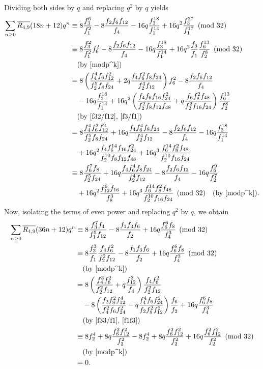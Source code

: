 \documentclass{amsart}
\theoremstyle{definition}
\begin{document}
Dividing both sides by $q$ and replacing $q^2$ by $q$ yields
\begin{align*}
		\sum_{n \ge 0} \overline{R_{4,9}}(18n+12) q^n 
		&\equiv 8 \frac{f_3^6}{f_1^2} - 8 \frac{f_2 f_{6} f_{12}}{f_4} - 16q \frac{f_3^{18}}{f_1^{14}} + 16q^2 \frac{f_3^{27}}{f_1^{17}} \pmod{32} \\
		&\equiv 8 \frac{f_3^2}{f_1^2} f_6^2 - 8 \frac{f_2 f_{6} f_{12}}{f_4} - 16q \frac{f_3^{18}}{f_1^{14}} + 16q^2 \frac{f_3}{f_1} \frac{f_6^{13}}{f_2^{8}} \pmod{32} \\
		&\quad \text{(by \eqref{modp^k})} \\
		&= 8 \left( \frac{f_4^4 f_6 f_{12}^2}{f_2^5 f_8 f_{24}} + 2q \frac{f_4 f_6^2 f_8 f_{24}}{f_2^4 f_{12}} \right) f_6^2 - 8 \frac{f_2 f_{6} f_{12}}{f_4} \\
		&\quad - 16q \frac{f_3^{18}}{f_1^{14}} + 16q^2 \left( \frac{f_4 f_6 f_{16} f_{24}^2}{f_2^2 f_8 f_{12} f_{48}} + q \frac{f_6 f_8^2 f_{48}}{f_2^2 f_{16} f_{24}} \right) \frac{f_6^{13}}{f_2^{8}} \\
		&\quad \text{(by \eqref{f32/f12}, \eqref{f3/f1})} \\
		&= 8 \frac{f_4^4 f_6^3 f_{12}^2}{f_2^5 f_8 f_{24}} + 16q \frac{f_4 f_6^4 f_8 f_{24}}{f_2^4 f_{12}} - 8 \frac{f_2 f_6 f_{12}}{f_4} - 16q \frac{f_3^{18}}{f_1^{14}} \\
		&\quad + 16q^2 \frac{f_4 f_6^{14} f_{16} f_{24}^2}{f_2^{10} f_8 f_{12} f_{48}} + 16q^3 \frac{f_6^{14} f_8^2 f_{48}}{f_2^{10} f_{16} f_{24}} \\
		&\equiv 8 \frac{f_6^7 f_8}{f_2^5 f_{24}} + 16q \frac{f_4 f_6^4 f_8 f_{24}}{f_2^4 f_{12}} - 8 \frac{f_2 f_6 f_{12}}{f_4} - 16q \frac{f_6^9}{f_2^7} \\
		&\quad + 16q^2 \frac{f_{12}^6 f_{16}}{f_8^3} + 16q^3 \frac{f_6^{14} f_8^2 f_{48}}{f_2^{10} f_{16} f_{24}} \pmod{32} \quad \text{(by \eqref{modp^k})}.
\end{align*}
Now, isolating the terms of even power and replacing $q^2$ by $q$, we obtain
\begin{align*}
		\sum_{n \ge 0} \overline{R_{4,9}}(36n+12) q^n 
		&\equiv 8 \frac{f_3^7 f_4}{f_1^5 f_{12}} - 8 \frac{f_1 f_3 f_{6}}{f_2} + 16q \frac{f_{6}^6 f_{8}}{f_4^3} \pmod{32} \\
		&\equiv 8 \frac{f_3^3}{f_1} \frac{f_4 f_6^2}{f_2^2 f_{12}} - 8 \frac{f_1 f_3 f_6}{f_2} + 16q \frac{f_6^6 f_8}{f_4^3} \pmod{32} \\
		&\quad \text{(by \eqref{modp^k})} \\
		&= 8 \left( \frac{f_4^3 f_6^2}{f_2^2 f_{12}} + q \frac{f_{12}^3}{f_4} \right) \frac{f_4 f_6^2}{f_2^2 f_{12}} \\
		&\quad - 8 \left( \frac{f_2 f_8^2 f_{12}^4}{f_4^2 f_6 f_{24}^2} - q \frac{f_4^4 f_6 f_{24}^2}{f_2 f_8^2 f_{12}^2} \right) \frac{f_6}{f_2} + 16q \frac{f_6^6 f_8}{f_4^3} \\
		&\quad \text{(by \eqref{f33/f1}, \eqref{f1f3})} \\
		&\equiv 8 f_2^4 + 8q \frac{f_6^2 f_{12}^2}{f_2^2} - 8 f_2^4 + 8q \frac{f_6^2 f_{12}^2}{f_2^2} + 16q \frac{f_6^2 f_{12}^2}{f_2^2} \pmod{32} \\
		&\quad \text{(by \eqref{modp^k})} \\
		&= 0.
\end{align*}
\end{document}
